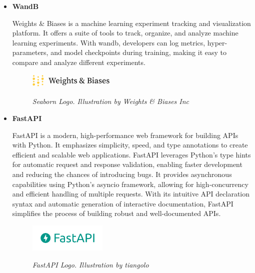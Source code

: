 \begin{itemize}
  \item \textbf{WandB}

    Weights \& Biases  is a machine learning
    experiment tracking and visualization platform. It offers a suite of tools
    to track, organize, and analyze machine learning experiments. With wandb,
    developers can log metrics, hyper-parameters, and model checkpoints during
    training, making it easy to compare and analyze different experiments.

    \begin{figure}[H]
      \centering
      \includegraphics[width=0.4\textwidth]{imatges/studies_and_decisions/wandb-logo.png}
      \caption[Seaborn Logo]{\textit{Seaborn Logo. Illustration by Weights \& Biases Inc}}
      {\label{fig:wandb-logo}}
    \end{figure}

  \item \textbf{FastAPI}

    FastAPI  is a modern,
    high-performance web framework for building APIs with Python. It emphasizes
    simplicity, speed, and type annotations to create efficient and scalable
    web applications. FastAPI leverages Python's type hints for automatic
    request and response validation, enabling faster development and reducing
    the chances of introducing bugs. It provides asynchronous capabilities
    using Python's asyncio framework, allowing for high-concurrency and
    efficient handling of multiple requests. With its intuitive API declaration
    syntax and automatic generation of interactive documentation, FastAPI
    simplifies the process of building robust and well-documented APIs.

    \begin{figure}[H]
      \centering
      \begin{adjustbox}{trim=0cm 0.25cm, clip}
        \includegraphics[width=0.35\textwidth]{imatges/studies_and_decisions/fastapi-logo.png}
      \end{adjustbox}
      \caption[FastAPI Logo]{\textit{FastAPI Logo. Illustration by tiangolo}}
      {\label{fig:fastapi-logo}}
    \end{figure}


\end{itemize}
